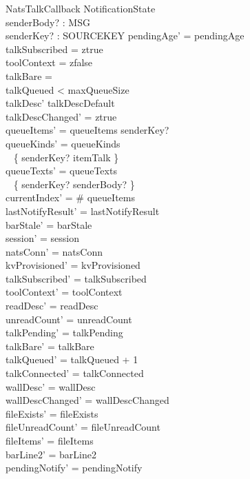 \documentclass[a4paper,10pt,fleqn]{article}
\begin{document}
\begin{schema}{NatsTalkCallback}
  \Delta NotificationState \\
  senderBody? : MSG \\
  senderKey? : SOURCEKEY
  \where
  pendingAge' = pendingAge \\
  talkSubscribed = ztrue \\
  toolContext = zfalse \\
  talkBare = \emptyset \\
  talkQueued < maxQueueSize \\
  talkDesc' \neq talkDescDefault \\
  talkDescChanged' = ztrue \\
  queueItems' = queueItems \cat \langle senderKey? \rangle \\
  queueKinds' = queueKinds \oplus \\
  \quad~ \{ senderKey? \mapsto itemTalk \} \\
  queueTexts' = queueTexts \oplus \\
  \quad~ \{ senderKey? \mapsto senderBody? \} \\
  currentIndex' = \# queueItems \\
  lastNotifyResult' = lastNotifyResult \\
  barStale' = barStale \\
  session' = session \\
  natsConn' = natsConn \\
  kvProvisioned' = kvProvisioned \\
  talkSubscribed' = talkSubscribed \\
  toolContext' = toolContext \\
  readDesc' = readDesc \\
  unreadCount' = unreadCount \\
  talkPending' = talkPending \\
  talkBare' = talkBare \\
  talkQueued' = talkQueued + 1 \\
  talkConnected' = talkConnected \\
  wallDesc' = wallDesc \\
  wallDescChanged' = wallDescChanged \\
  fileExists' = fileExists \\
  fileUnreadCount' = fileUnreadCount \\
  fileItems' = fileItems \\
  barLine2' = barLine2 \\
  pendingNotify' = pendingNotify \\

\end{schema}
\end{document}
